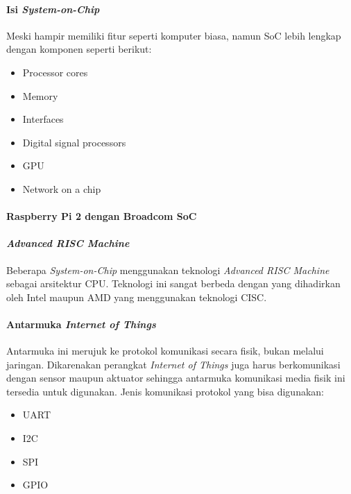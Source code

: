 \begin{frame}{\insertsectionhead}
	\framesubtitle{Isi \textit{System-on-Chip}}
	\justifying
	Meski hampir memiliki fitur seperti komputer biasa, namun SoC lebih lengkap dengan komponen seperti berikut:
	\vfill
	\begin{itemize}
		\item Processor cores
		\item Memory
		\item Interfaces
		\item Digital signal processors
		\item GPU
		\item Network on a chip
	\end{itemize}
\end{frame}

\begin{frame}{\insertsectionhead}
	\framesubtitle{Raspberry Pi 2 dengan Broadcom SoC}
	\justifying
	\begin{figure}[ht!]
		\begin{subfigure}[b]{0.5\textwidth}
		\end{subfigure}
	\end{figure}
\end{frame}

\begin{frame}{\insertsectionhead}
	\framesubtitle{\textit{Advanced RISC Machine}}
	\justifying
	Beberapa \textit{System-on-Chip} menggunakan teknologi \textit{Advanced RISC Machine} sebagai arsitektur CPU.  Teknologi ini sangat berbeda dengan yang dihadirkan oleh Intel maupun AMD yang menggunakan teknologi CISC.
	\vfill
	\begin{figure}[ht!]
		\begin{subfigure}[b]{0.5\textwidth}
		\end{subfigure}
	\end{figure}
\end{frame}

\begin{frame}{\insertsectionhead}
	\framesubtitle{Antarmuka \textit{Internet of Things}}
	\justifying
	Antarmuka ini merujuk ke protokol komunikasi secara fisik, bukan melalui jaringan. Dikarenakan perangkat \textit{Internet of Things} juga harus berkomunikasi dengan sensor maupun aktuator sehingga antarmuka komunikasi media fisik ini tersedia untuk digunakan.
	\vfill
	Jenis komunikasi protokol yang bisa digunakan:
	\begin{itemize}
		\item UART
		\item I2C
		\item SPI
		\item GPIO
	\end{itemize}
\end{frame}

